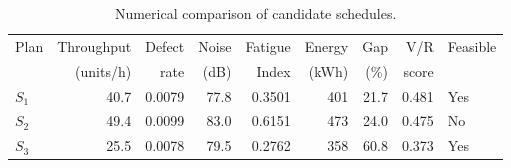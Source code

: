 \begin{table}[htbp]
\centering
\caption{Numerical comparison of candidate schedules.}
\label{tab:numerical-sim}
\small
\begin{tabular}{@{}lrrrrrrrl@{}}
\toprule
Plan & Throughput & Defect & Noise & Fatigue & Energy & Gap & V/R & Feasible \\
     & (units/h)  & rate   & (dB)  & Index   & (kWh)  & (\%) & score &         \\
\midrule
$S_{1}$ & 40.7 & 0.0079 & 77.8 & 0.3501 & 401 & 21.7 & 0.481 & Yes \\
$S_{2}$ & 49.4 & 0.0099 & 83.0 & 0.6151 & 473 & 24.0 & 0.475 & No \\
$S_{3}$ & 25.5 & 0.0078 & 79.5 & 0.2762 & 358 & 60.8 & 0.373 & Yes \\
\bottomrule
\end{tabular}
\end{table}
